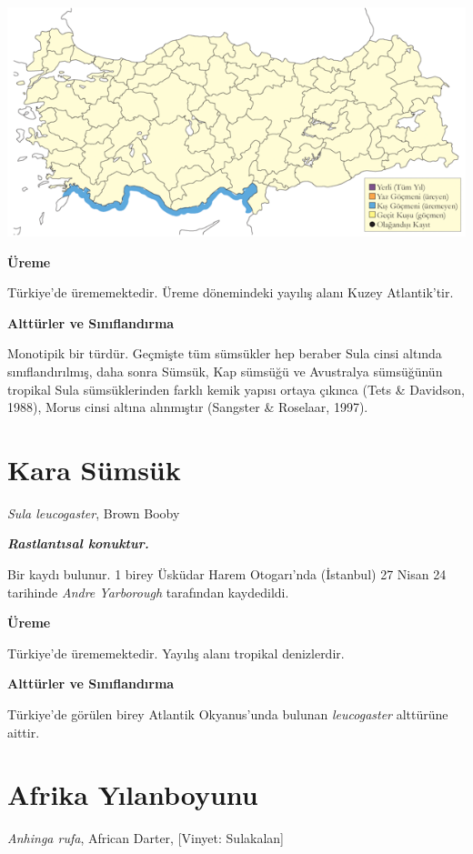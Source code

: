 \documentclass[
  a4paper,
  DIV=11,
  numbers=noendperiod]{scrreprt}
\begin{document}
\includegraphics{images/harita_Page_076.png}

\textbf{Üreme}

Türkiye'de ürememektedir. Üreme dönemindeki yayılış alanı Kuzey
Atlantik'tir.

\textbf{Alttürler ve Sınıflandırma}

Monotipik bir türdür. Geçmişte tüm sümsükler hep beraber Sula cinsi
altında sınıflandırılmış, daha sonra Sümsük, Kap sümsüğü ve Avustralya
sümsüğünün tropikal Sula sümsüklerinden farklı kemik yapısı ortaya
çıkınca (Tets \& Davidson, 1988), Morus cinsi altına alınmıştır
(Sangster \& Roselaar, 1997).

\section{Kara Sümsük}\label{kara-suxfcmsuxfck}

\emph{Sula leucogaster}, Brown Booby

\textbf{\emph{Rastlantısal konuktur.}}

Bir kaydı bulunur. 1 birey Üsküdar Harem Otogarı'nda (İstanbul) 27 Nisan
24 tarihinde \emph{Andre Yarborough} tarafından kaydedildi.

\textbf{Üreme}

Türkiye'de ürememektedir. Yayılış alanı tropikal denizlerdir.

\textbf{Alttürler ve Sınıflandırma}

Türkiye'de görülen birey Atlantik Okyanus'unda bulunan
\emph{leucogaster} alttürüne aittir.

\section{Afrika Yılanboyunu}\label{afrika-yux131lanboyunu}

\emph{Anhinga rufa}, African Darter, {[}Vinyet: Sulakalan{]}
\end{document}
